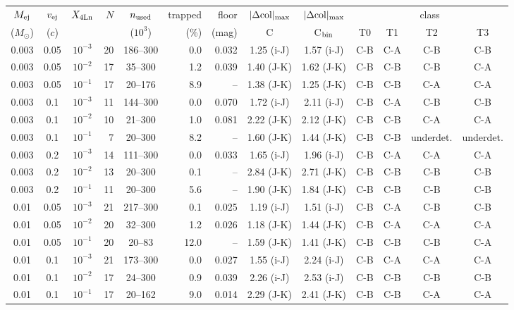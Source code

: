 \begin{tabular}{cccrcrrcccccc}
\toprule
$M_{\rm ej}$ & $v_{\rm ej}$ & $X_{\rm 4Ln}$ & $N$ & $n_{\rm used}$ & trapped & floor & $|\Delta{\rm col}|_{\max}$ & $|\Delta{\rm col}|_{\max}$ & \multicolumn{4}{c}{class} \\
($M_\odot$) & ($c$) & & & ($10^3$) & (\%) & (mag) & C & C$_{\rm bin}$ & T0 & T1 & T2 & T3 \\
\midrule
0.003 & 0.05 & $10^{-3}$ & 20 & 186--300 & 0.0 & 0.032 & 1.25 (i-J) & 1.57 (i-J) & C-B & C-A & C-B & C-B \\
0.003 & 0.05 & $10^{-2}$ & 17 & 35--300 & 1.2 & 0.039 & 1.40 (J-K) & 1.62 (J-K) & C-B & C-B & C-B & C-A \\
0.003 & 0.05 & $10^{-1}$ & 17 & 20--176 & 8.9 & -- & 1.38 (J-K) & 1.25 (J-K) & C-B & C-B & C-A & C-A \\
0.003 & 0.1 & $10^{-3}$ & 11 & 144--300 & 0.0 & 0.070 & 1.72 (i-J) & 2.11 (i-J) & C-B & C-A & C-B & C-B \\
0.003 & 0.1 & $10^{-2}$ & 10 & 21--300 & 1.0 & 0.081 & 2.22 (J-K) & 2.12 (J-K) & C-B & C-B & C-A & C-A \\
0.003 & 0.1 & $10^{-1}$ & 7 & 20--300 & 8.2 & -- & 1.60 (J-K) & 1.44 (J-K) & C-B & C-B & underdet. & underdet. \\
0.003 & 0.2 & $10^{-3}$ & 14 & 111--300 & 0.0 & 0.033 & 1.65 (i-J) & 1.96 (i-J) & C-B & C-A & C-A & C-A \\
0.003 & 0.2 & $10^{-2}$ & 13 & 20--300 & 0.1 & -- & 2.84 (J-K) & 2.71 (J-K) & C-B & C-B & C-B & C-B \\
0.003 & 0.2 & $10^{-1}$ & 11 & 20--300 & 5.6 & -- & 1.90 (J-K) & 1.84 (J-K) & C-B & C-B & C-B & C-B \\
0.01 & 0.05 & $10^{-3}$ & 21 & 217--300 & 0.1 & 0.025 & 1.19 (i-J) & 1.51 (i-J) & C-B & C-A & C-B & C-B \\
0.01 & 0.05 & $10^{-2}$ & 20 & 32--300 & 1.2 & 0.026 & 1.18 (J-K) & 1.44 (J-K) & C-B & C-A & C-A & C-A \\
0.01 & 0.05 & $10^{-1}$ & 20 & 20--83 & 12.0 & -- & 1.59 (J-K) & 1.41 (J-K) & C-B & C-B & C-B & C-A \\
0.01 & 0.1 & $10^{-3}$ & 21 & 173--300 & 0.0 & 0.027 & 1.55 (i-J) & 2.24 (i-J) & C-B & C-A & C-A & C-A \\
0.01 & 0.1 & $10^{-2}$ & 17 & 24--300 & 0.9 & 0.039 & 2.26 (i-J) & 2.53 (i-J) & C-B & C-B & C-B & C-B \\
0.01 & 0.1 & $10^{-1}$ & 17 & 20--162 & 9.0 & 0.014 & 2.29 (J-K) & 2.41 (J-K) & C-B & C-B & C-A & C-A \\

\end{tabular}
